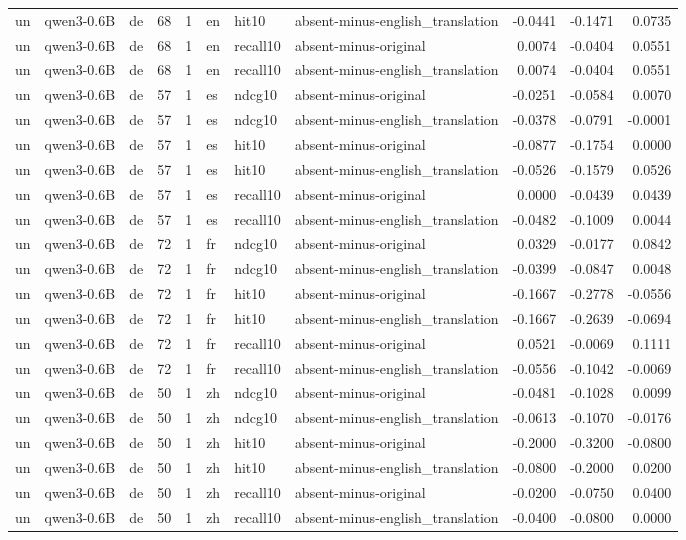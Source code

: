 \begin{tabular}{lllrrlllrrr}
un & qwen3-0.6B & de & 68 & 1 & en & hit10 & absent-minus-english\_translation & -0.0441 & -0.1471 & 0.0735 \\
un & qwen3-0.6B & de & 68 & 1 & en & recall10 & absent-minus-original & 0.0074 & -0.0404 & 0.0551 \\
un & qwen3-0.6B & de & 68 & 1 & en & recall10 & absent-minus-english\_translation & 0.0074 & -0.0404 & 0.0551 \\
un & qwen3-0.6B & de & 57 & 1 & es & ndcg10 & absent-minus-original & -0.0251 & -0.0584 & 0.0070 \\
un & qwen3-0.6B & de & 57 & 1 & es & ndcg10 & absent-minus-english\_translation & -0.0378 & -0.0791 & -0.0001 \\
un & qwen3-0.6B & de & 57 & 1 & es & hit10 & absent-minus-original & -0.0877 & -0.1754 & 0.0000 \\
un & qwen3-0.6B & de & 57 & 1 & es & hit10 & absent-minus-english\_translation & -0.0526 & -0.1579 & 0.0526 \\
un & qwen3-0.6B & de & 57 & 1 & es & recall10 & absent-minus-original & 0.0000 & -0.0439 & 0.0439 \\
un & qwen3-0.6B & de & 57 & 1 & es & recall10 & absent-minus-english\_translation & -0.0482 & -0.1009 & 0.0044 \\
un & qwen3-0.6B & de & 72 & 1 & fr & ndcg10 & absent-minus-original & 0.0329 & -0.0177 & 0.0842 \\
un & qwen3-0.6B & de & 72 & 1 & fr & ndcg10 & absent-minus-english\_translation & -0.0399 & -0.0847 & 0.0048 \\
un & qwen3-0.6B & de & 72 & 1 & fr & hit10 & absent-minus-original & -0.1667 & -0.2778 & -0.0556 \\
un & qwen3-0.6B & de & 72 & 1 & fr & hit10 & absent-minus-english\_translation & -0.1667 & -0.2639 & -0.0694 \\
un & qwen3-0.6B & de & 72 & 1 & fr & recall10 & absent-minus-original & 0.0521 & -0.0069 & 0.1111 \\
un & qwen3-0.6B & de & 72 & 1 & fr & recall10 & absent-minus-english\_translation & -0.0556 & -0.1042 & -0.0069 \\
un & qwen3-0.6B & de & 50 & 1 & zh & ndcg10 & absent-minus-original & -0.0481 & -0.1028 & 0.0099 \\
un & qwen3-0.6B & de & 50 & 1 & zh & ndcg10 & absent-minus-english\_translation & -0.0613 & -0.1070 & -0.0176 \\
un & qwen3-0.6B & de & 50 & 1 & zh & hit10 & absent-minus-original & -0.2000 & -0.3200 & -0.0800 \\
un & qwen3-0.6B & de & 50 & 1 & zh & hit10 & absent-minus-english\_translation & -0.0800 & -0.2000 & 0.0200 \\
un & qwen3-0.6B & de & 50 & 1 & zh & recall10 & absent-minus-original & -0.0200 & -0.0750 & 0.0400 \\
un & qwen3-0.6B & de & 50 & 1 & zh & recall10 & absent-minus-english\_translation & -0.0400 & -0.0800 & 0.0000 \\
\bottomrule
\end{tabular}
